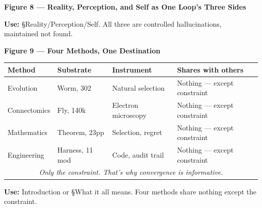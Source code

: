 \documentclass[11pt]{article}
\begin{document}
\vspace{14pt}
\begin{center}
\textbf{Figure 8 — Reality, Perception, and Self as One Loop's Three Sides}
\end{center}
\begin{center}
\end{center}
{\scriptsize \textbf{Use:} \S Reality/Perception/Self. All three are controlled hallucinations, maintained not found.}

\vspace{14pt}
\begin{center}
\textbf{Figure 9 — Four Methods, One Destination}
\end{center}
{\scriptsize
\begin{center}
\begin{tabular}{p{2.5cm}p{2.6cm}p{2.8cm}p{3.0cm}}
\toprule
Method & Substrate & Instrument & Shares with others \\
\midrule
Evolution & Worm, 302 & Natural selection & Nothing — except constraint \\
Connectomics & Fly, 140k & Electron microscopy & Nothing — except constraint \\
Mathematics & Theorem, 23pp & Selection, regret & Nothing — except constraint \\
Engineering & Harness, 11 mod & Code, audit trail & Nothing — except constraint \\
\midrule
\multicolumn{4}{c}{\textit{Only the constraint. That's why convergence is informative.}} \\
\bottomrule
\end{tabular}
\end{center}
}
{\scriptsize \textbf{Use:} Introduction or \S What it all means. Four methods share nothing except the constraint.}
\end{document}
